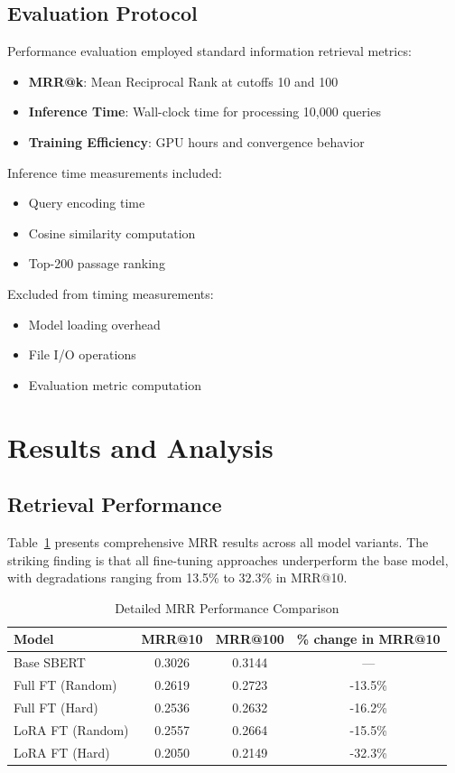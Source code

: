 \documentclass[conference]{IEEEtran}
\begin{document}
\subsection{Evaluation Protocol}
Performance evaluation employed standard information retrieval metrics:
\begin{itemize}
\item \textbf{MRR@k}: Mean Reciprocal Rank at cutoffs 10 and 100
\item \textbf{Inference Time}: Wall-clock time for processing 10,000 queries
\item \textbf{Training Efficiency}: GPU hours and convergence behavior
\end{itemize}

Inference time measurements included:
\begin{itemize}
\item Query encoding time
\item Cosine similarity computation
\item Top-200 passage ranking
\end{itemize}

Excluded from timing measurements:
\begin{itemize}
\item Model loading overhead
\item File I/O operations
\item Evaluation metric computation
\end{itemize}

\section{Results and Analysis}
\subsection{Retrieval Performance}
Table~\ref{tab:mrr_detailed} presents comprehensive MRR results across all model variants. The striking finding is that all fine-tuning approaches underperform the base model, with degradations ranging from 13.5\% to 32.3\% in MRR@10.

\begin{table}[h]
\centering
\caption{Detailed MRR Performance Comparison}
\label{tab:mrr_detailed}
\begin{tabular}{lccc}
\toprule
Model & MRR@10 & MRR@100 & \% change in MRR@10 \\
\midrule
Base SBERT & 0.3026 & 0.3144 & — \\
Full FT (Random) & 0.2619 & 0.2723 & -13.5\% \\
Full FT (Hard) & 0.2536 & 0.2632 & -16.2\% \\
LoRA FT (Random) & 0.2557 & 0.2664 & -15.5\% \\
LoRA FT (Hard) & 0.2050 & 0.2149 & -32.3\% \\
\bottomrule
\end{tabular}
\end{table}
\end{document}
